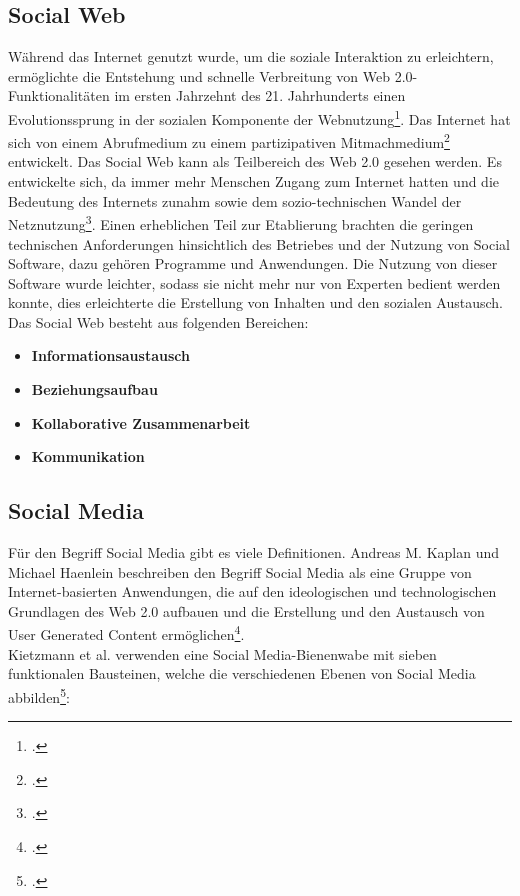 \subsection{Social Web}

Während das Internet genutzt wurde, um die soziale Interaktion zu erleichtern, ermöglichte die Entstehung und schnelle Verbreitung von Web 2.0-Funktionalitäten im ersten Jahrzehnt des 21. Jahrhunderts einen Evolutionssprung in der sozialen Komponente der Webnutzung\footcite[S. 745-750]{obarSocialMedia}. Das Internet hat sich von einem Abrufmedium zu einem partizipativen Mitmachmedium\footcite{panke} entwickelt. Das Social Web kann als Teilbereich des Web 2.0 gesehen werden. Es entwickelte sich, da immer mehr Menschen Zugang zum Internet hatten und die Bedeutung des Internets zunahm sowie dem sozio-technischen Wandel der Netznutzung\footcite[S. 350]{griesbaum}. Einen erheblichen Teil zur Etablierung brachten die geringen technischen Anforderungen hinsichtlich des Betriebes und der Nutzung von Social Software, dazu gehören Programme und Anwendungen. Die Nutzung von dieser Software wurde leichter, sodass sie nicht mehr nur von Experten bedient werden konnte, dies erleichterte die Erstellung von Inhalten und den sozialen Austausch.
Das Social Web besteht aus folgenden Bereichen:
\begin{itemize}
	\item \textbf{Informationsaustausch}
	\item \textbf{Beziehungsaufbau}
	\item \textbf{Kollaborative Zusammenarbeit}
	\item \textbf{Kommunikation}
\end{itemize}


\subsection{Social Media}
\label{sozialMedia}


Für den Begriff Social Media gibt es viele Definitionen. Andreas M. Kaplan und Michael Haenlein beschreiben den Begriff Social Media als eine Gruppe von Internet-basierten Anwendungen, die auf den ideologischen und technologischen Grundlagen des Web 2.0 aufbauen und die Erstellung und den Austausch von User Generated Content ermöglichen\footcite[S. 59-68]{kaplan}.\\
Kietzmann et al. verwenden eine Social Media-Bienenwabe mit sieben funktionalen Bausteinen, welche die verschiedenen Ebenen von Social Media abbilden\footcite[S.241-251]{kietzmann}:

